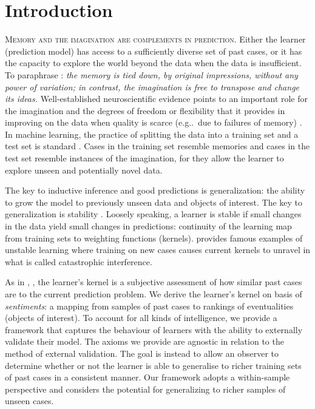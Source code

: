 \documentclass[ecta,nameyear,draft]{econsocart}
\makeatletter
\newcommand\eg{e\@.g\@ifnextchar.{}{.\@}}
\newcommand{\gsii}{$\textup{GS03}$}
\theoremstyle{plain}
\theoremstyle{remark}
\makeatother
\begin{document}
\section{Introduction} \label{sec-introduction}
\textsc{Memory and the imagination are complements in prediction}. Either the
learner (prediction model) has access to a sufficiently diverse set of past
cases, or it has the capacity to explore the world beyond the data when the
data is insufficient.
To paraphrase \citep[pages 9 and 10]{hume1896treatise}: \emph{the memory is
  tied down, by original impressions, without any power of variation; in
contrast, the imagination is free to transpose and change its ideas.}
Well-established neuroscientific evidence points to an important role for the
imagination and the degrees of freedom or flexibility that it provides in
improving on the data when quality is scarce (\eg\ due to failures of memory)
\citep{bartlett1932remembering,suddendorf2007evolution,mullally2013memory}. In
machine learning, the practice of splitting the data into a training set and a
test set is standard \citep{hastie2009elements}. Cases in the training set
resemble memories and cases in the test set resemble instances of the
imagination, for they allow the learner to explore unseen and potentially novel
data.

The key to inductive inference and good predictions is generalization: the
ability to grow the model to previously unseen data and objects of interest.
The key to generalization is stability
\citep{bousquet2002stability,poggio2004general,mukherjee2006learning}. Loosely
speaking, a learner is stable if small changes in the data yield small changes
in predictions: continuity of the learning map from training sets to
weighting functions (kernels).  \cite{mccloskey1989catastrophic} provides
famous examples of unstable learning where training on new cases causes current
kernels to unravel in what is called catastrophic interference.

As in \citet[henceforth, \gsii]{gilboa2003inductive},
\citet{billot2005probabilities,gilboa2006empirical,argenziano2019second}, the
learner's kernel is a subjective assessment of how similar past cases are to
the current prediction problem.  We derive the learner's kernel on basis of
\emph{sentiments}: a mapping from samples of past cases to rankings of
eventualities (objects of interest).  To account for all kinds of
intelligence, we provide a framework that captures the behaviour of learners
with the ability to externally validate their model. The axioms we provide are
agnostic in relation to the method of external validation. The goal is instead
to allow an observer to determine whether or not the learner is able to
generalise to richer training sets of past cases in a consistent manner. Our
framework adopts a within-sample perspective \citep[page 7, experiment
1]{chervonenkis2015recollections} and considers the potential for generalizing
to richer samples of unseen cases.
\end{document}
